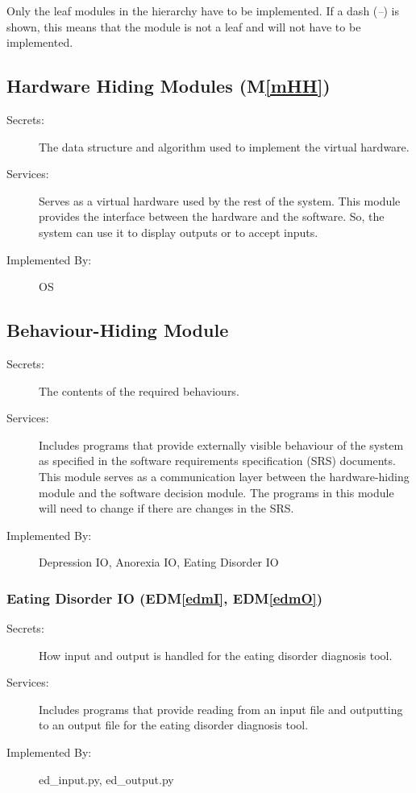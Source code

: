 \documentclass[12pt, titlepage]{article}
\newcommand{\mref}[1]{M\ref{#1}}
\newcommand{\edmref}[1]{EDM\ref{#1}}
\begin{document}
Only the leaf modules in the hierarchy have to be implemented. If a dash
(\emph{--}) is shown, this means that the module is not a leaf and will not have
to be implemented.

\subsection{Hardware Hiding Modules (\mref{mHH})}

\begin{description}
\item[Secrets:]The data structure and algorithm used to implement the virtual
  hardware.
\item[Services:]Serves as a virtual hardware used by the rest of the
  system. This module provides the interface between the hardware and the
  software. So, the system can use it to display outputs or to accept inputs.
\item[Implemented By:] OS
\end{description}

\subsection{Behaviour-Hiding Module}

\begin{description}
\item[Secrets:]The contents of the required behaviours.
\item[Services:]Includes programs that provide externally visible behaviour of
  the system as specified in the software requirements specification (SRS)
  documents. This module serves as a communication layer between the
  hardware-hiding module and the software decision module. The programs in this
  module will need to change if there are changes in the SRS.
\item[Implemented By:] Depression IO, Anorexia IO, Eating Disorder IO
\end{description}

\subsubsection{Eating Disorder IO (\edmref{edmI}, \edmref{edmO})}
\begin{description}
\item[Secrets:]How input and output is handled for the eating disorder diagnosis tool.
\item[Services:]Includes programs that provide reading from an input file and outputting to an output file for the eating disorder diagnosis tool.
\item[Implemented By:] ed\_input.py, ed\_output.py
\end{description}
\end{document}
